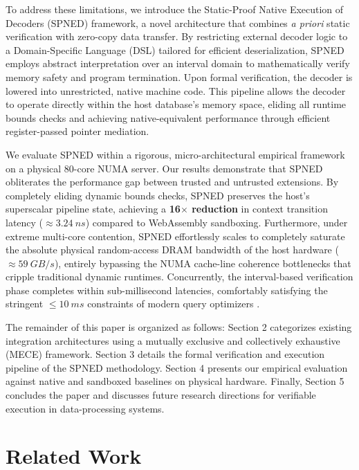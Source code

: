 \documentclass[onecolumn]{IEEEtran}
\numberwithin{equation}{section}
\theoremstyle{definition}
\theoremstyle{remark}
\begin{document}
To address these limitations, we introduce the Static-Proof Native Execution of Decoders (SPNED) framework, a novel architecture that combines \textit{a priori} static verification with zero-copy data transfer. By restricting external decoder logic to a Domain-Specific Language (DSL) tailored for efficient deserialization, SPNED employs abstract interpretation over an interval domain to mathematically verify memory safety and program termination. Upon formal verification, the decoder is lowered into unrestricted, native machine code. This pipeline allows the decoder to operate directly within the host database's memory space, eliding all runtime bounds checks and achieving native-equivalent performance through efficient register-passed pointer mediation.

We evaluate SPNED within a rigorous, micro-architectural empirical framework on a physical 80-core NUMA server. Our results demonstrate that SPNED obliterates the performance gap between trusted and untrusted extensions. By completely eliding dynamic bounds checks, SPNED preserves the host's superscalar pipeline state, achieving a \textbf{16$\times$ reduction} in context transition latency ($\approx \SI{3.24}{ns}$) compared to WebAssembly sandboxing. Furthermore, under extreme multi-core contention, SPNED effortlessly scales to completely saturate the absolute physical random-access DRAM bandwidth of the host hardware ($\approx \SI{59}{GB/s}$), entirely bypassing the NUMA cache-line coherence bottlenecks that cripple traditional dynamic runtimes. Concurrently, the interval-based verification phase completes within sub-millisecond latencies, comfortably satisfying the stringent $\le \SI{10}{ms}$ constraints of modern query optimizers \cite{anneser2023autosteer}.

The remainder of this paper is organized as follows: Section 2 categorizes existing integration architectures using a mutually exclusive and collectively exhaustive (MECE) framework. Section 3 details the formal verification and execution pipeline of the SPNED methodology. Section 4 presents our empirical evaluation against native and sandboxed baselines on physical hardware. Finally, Section 5 concludes the paper and discusses future research directions for verifiable execution in data-processing systems.

\section{Related Work}
\end{document}

